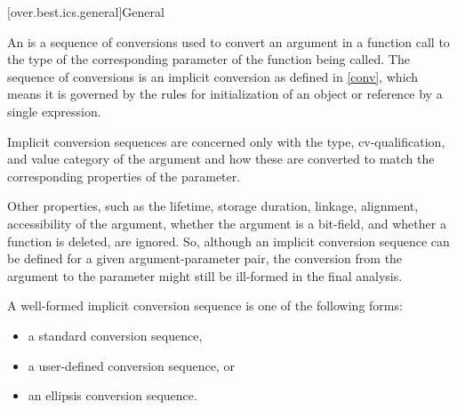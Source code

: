 [over.best.ics.general]{General}%

\pnum
An 
is a sequence of conversions used
to convert an argument in a function call to the type of the
corresponding parameter of the function being called.
The
sequence of conversions is an implicit conversion as defined in
\ref{conv}, which means it is governed by the rules for
initialization of an object or reference by a single
expression.

\pnum
Implicit conversion sequences are concerned only with the type,
cv-qualification, and value category of the argument and how these
are converted to match the corresponding properties of the
parameter.
\begin{note}
Other properties, such as the lifetime, storage duration, linkage,
alignment, accessibility of the argument, whether the argument is a bit-field,
and whether a function is deleted, are ignored.
So, although an implicit
conversion sequence can be defined for a given argument-parameter
pair, the conversion from the argument to the parameter might still
be ill-formed in the final analysis.
\end{note}

\pnum
A
well-formed implicit conversion
sequence is one of the following forms:
\begin{itemize}
\item
a standard conversion sequence,
\item
a user-defined conversion sequence, or
\item
an ellipsis conversion sequence.
\end{itemize}

